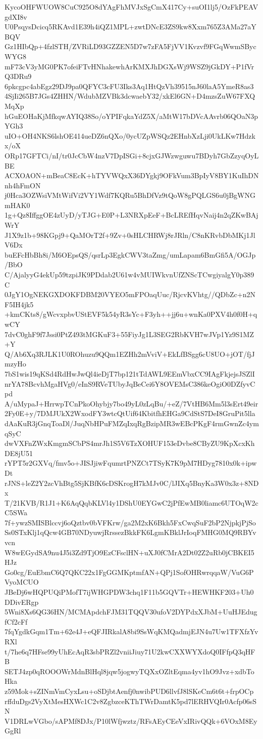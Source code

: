 KycoOHFWUOW8CuC925O8dYAgFhMVJxSgCmX417Cy+suOI1lj5/OzFkPEAVgdXI8v
U0PsqysDcicq5RKAvd1E39h4iQZ1MPL+zwtDNcE3ZS9kw8Xxm765Z3AMa27aYBQV
Gz1HIbQp+4fzlSTH/ZVRiLD93GZZEN5D7w7zFA5FjVV1Kvzvf9FGqWwmSBycWYG8
mF73cV3yMG0PK7ofeiFTvHNhakewhArKMXJhDGXsWj9WSZ9jGkDY+P1fVrQ3DRu9
6pkcgpc4abEgz29DJ9pa0QFYC3cFU3Iks3Aq1HtQzVh39515nJ60laA5YmeR8as3
4SjIi265B7JGs4ZHHN/WdubMZVBk3dcwaebY32/xkEl6GN+D4mzsZuW67FXQMqXp
hGuEOHaKjMfkqwAYIQ38So/oYPIFqkaYdZ5X/aMtW17bDVcAAvrb06QOaN3pYGh3
uIO+OH4NKS6lshOE414ueDZ6nQXo/0ycUZpWSQz2EHnbXzLji0UkLKw7Hdzkx/oX
ORp17GFTCi/nI/tr0JcCbW4nzV7DpISGi+8cjxGJWzwguwu7BDyh7GbZzyqOyLBE
ACXOAON+mBeaC8EcK+hTYVWQxX36DYgkj9OFkVum3BpIyV8BY1KuIhDNnh4hFmON
j0Hca3OZWsiVMtWifVi2VY1Wdf7KQRu5BhDfVz9tQoW8gPQLGS6u0jBgWNGmHAK0
1g+Qz8IffggOE4zUyD/yTJG+E0P+L3NRXpEeF+BcLREfHqvNaij4n2qZKwBAjWrY
J1X9z1b+98KGpj9+QaMOrT2f+9Zv+0sHLCHRWj8rJRln/C8nKRvbDbMKj1JlV6Dx
buEFcHbBh8i/M6OEpsQS/qsrLp3EgkCWV3taZmg/umLapam6BmGfi5A/OGJp/BbO
C/AjalyyG4ekUp59tzpiJK9PDdab2U61w4vMUIWkvnUfZNScTCwgiyalgY0p389C
0JgY1OgNEKGXDOKFDBM20VYEO5mFPOaqUuc/RjcvKVhtg//QDbZc+n2NF5IH4jk5
+kmCKts8/gWcvxpbvUStEVF5k54yR3sYc+F3yh++jj6u+wnKa0PXV4h0f0H+qwCY
7dvC0ghF9f7Jssi0PtZ493tMGKuF3+55FiyJg1L3SEG2RbKVH7wJVp1Yz9S1MZ+Y
Q/Ab6Xq3RJLK1U0ROhuzu9QQm1EZHh2mVviV+EkLfBSgg6cU8UO+jOT/fjJmzyHo
7bS1wis19qKSd4RdHwJwQl4ieDjT7bp121tTdAWL9EEmVbxCC9IAgFkjejsJSZlI
nrYA78BcvhMgaHVg0/eInS9RVeTUbyJqBeCei6Y8OVEMsC386keOgiO0DZfyvCpd
A/uMypaJ+HrrwpTCnPkoOhybjy7bo49yL0zLqBu/+eZ/7VtHB6Mm5l3sErt49eir
2Fy0E+y/7DMJUkX2WxodFY3wtcQtUif64KbitfhEHGa9CdStS7DeI8GruPit5lla
dAaKuR3jGnqToaDl/JuqNbHPuFMZqIxqRgBzipMR3wEBcPKgF4rmGwnZc4ymqSyC
dwVXFnZWxKmgmSCbPS4mrJh1S5V6TzXOHUF153eDvbe8CByZU9KpXcxKhDE8jU51
rYPT5r2GXVq/fmv5o+JISJjiwFqumrtPNZCt7TSyK7K9pM7HDyg7810x0k+ipwDt
rJNS+leZ2Y2zcVhBtg5SjKBfK6cDSKrogH7kMJv0C/lJIXq5BnyKa3W0x3z+8NDx
T/21KVB/R1J1+K6AqQqbKLVl4y1DShU0EYGwC2jPfEwMB0liamc6UTOqW2cC5SWa
7f+ywzSMISBlccvj6oQztbv0bVFKrw/ga2M2xK6Bkh5FxCwqSuF2bP2NjpkjPjSo
Ss0STxKlj1qQcw4GB70NDyuwjRrssezBkkFK6LgmKBklJrIoqFMHG0MQ9RBYvvcn
W8wEGydSA9nu4J5i3Zd9TjO9EzCFsclHN+uXJ0fCMrA2Dt02Z2uRb0jCBKEI5HJz
Go0cg/EuEbmC6Q7QKC22x1FgGGMKptmfAN+QPj1SofOHRwrqqaW/VuG6PVyoMCUO
JBeDj6wHQPUQiPMofT7ijWHGPDW3chq1F11b5GQVTr+HEWHKF203+Uh0DDivERgp
5Wni8Xs6QG36HN/MCMApdchFJM31TQQV30ufoV2DYPdxXJbM+UuHJEdugfCf2cFf
7fqYgdkGqm1Tm+62e4J+eQFJIRkalA8bi9SsWqKMQadmjEJN4u7Uw1TFXfzYvRXl
t/7he6q7HFse99yUhEcAqR3sbPRZl2vniiJiuy71U2kwCXXWYXdoQ0IFfpQ3qHFB
SETJ4zp0qROOOWrMdnBlHql8jqw5jogwyTQXxOZltEqma4yv1hO9Jvz+xdbToHka
z59Mok+sZINmVmCyxLsu+oSDjbtAenfj0nwibPUD6llvfJ8lSKeCm6t6t+frpOCp
rffduDgs2VyXtMesHXWc1C2v8ZgbzceKThTWrDamtK5pd7lERHVQIr0Acfp06sSN
V1DRLwVGbo/sAPMf8DJx/P10lWfjwztz/RFsAEyCEeVxIRivQQk+6VOxM8EyGgRl
